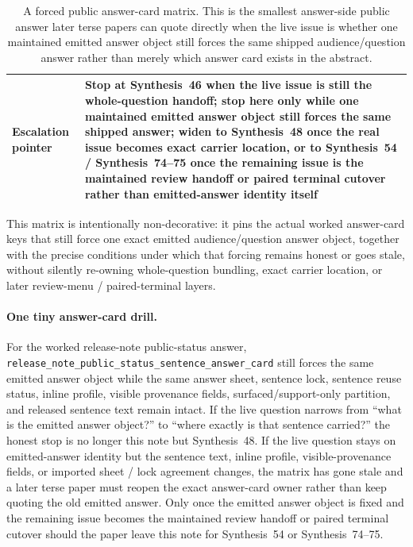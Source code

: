 \documentclass[11pt]{article}
\begin{document}
\begin{table}[t]
\begin{tabularx}{\linewidth}{@{}lX@{}}
Escalation pointer & Stop at Synthesis~46 when the live issue is still the whole-question handoff; stop here only while one maintained emitted answer object still forces the same shipped answer; widen to Synthesis~48 once the real issue becomes exact carrier location, or to Synthesis~54 / Synthesis~74--75 once the remaining issue is the maintained review handoff or paired terminal cutover rather than emitted-answer identity itself \\
\bottomrule
\end{tabularx}
\caption{A forced public answer-card matrix. This is the smallest answer-side public answer later terse papers can quote directly when the live issue is whether one maintained emitted answer object still forces the same shipped audience/question answer rather than merely which answer card exists in the abstract.}
\label{tab:forced-public-answer-card-matrix}
\end{table}

This matrix is intentionally non-decorative: it pins the actual worked answer-card keys that still force one exact emitted audience/question answer object, together with the precise conditions under which that forcing remains honest or goes stale, without silently re-owning whole-question bundling, exact carrier location, or later review-menu / paired-terminal layers.\cite{series:workedexample}

\paragraph{One tiny answer-card drill.}
For the worked release-note public-status answer, \nolinkurl{release_note_public_status_sentence_answer_card} still forces the same emitted answer object while the same answer sheet, sentence lock, sentence reuse status, inline profile, visible provenance fields, surfaced/support-only partition, and released sentence text remain intact. If the live question narrows from ``what is the emitted answer object?'' to ``where exactly is that sentence carried?'' the honest stop is no longer this note but Synthesis~48. If the live question stays on emitted-answer identity but the sentence text, inline profile, visible-provenance fields, or imported sheet / lock agreement changes, the matrix has gone stale and a later terse paper must reopen the exact answer-card owner rather than keep quoting the old emitted answer. Only once the emitted answer object is fixed and the remaining issue becomes the maintained review handoff or paired terminal cutover should the paper leave this note for Synthesis~54 or Synthesis~74--75.\cite{series:workedexample}
\end{document}
